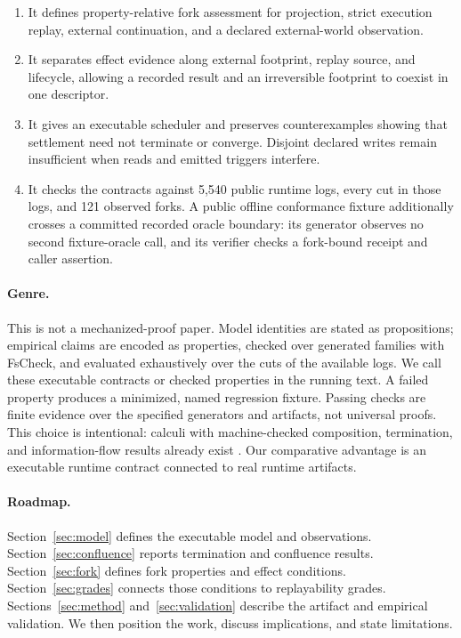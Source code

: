 \begin{enumerate}[leftmargin=*]
  \item It defines property-relative fork assessment for projection, strict
  execution replay, external continuation, and a declared external-world
  observation.

  \item It separates effect evidence along external footprint, replay source,
  and lifecycle, allowing a recorded result and an irreversible footprint to
  coexist in one descriptor.

  \item It gives an executable scheduler and preserves counterexamples showing
  that settlement need not terminate or converge.  Disjoint declared writes
  remain insufficient when reads and emitted triggers interfere.

  \item It checks the contracts against 5,540 public runtime logs, every cut in
  those logs, and 121 observed forks.  A public offline conformance fixture
  additionally crosses a committed recorded oracle boundary: its generator
  observes no second fixture-oracle call, and its verifier checks a fork-bound
  receipt and caller assertion.
\end{enumerate}

\paragraph{Genre.}
This is not a mechanized-proof paper.  Model identities are stated as
propositions; empirical claims are encoded as properties, checked over
generated families with FsCheck, and evaluated exhaustively over the cuts of
the available logs.  We call these executable contracts or checked properties
in the running text.  A failed property produces a minimized, named
regression fixture.  Passing checks are finite evidence over the specified
generators and artifacts, not universal proofs.  This choice is intentional:
calculi with
machine-checked composition, termination, and information-flow results already
exist \cite{liu2026lambdaa,garby2026llmbda}.  Our comparative advantage is an
executable runtime contract connected to real runtime artifacts.

\paragraph{Roadmap.}
Section~\ref{sec:model} defines the executable model and observations.
Section~\ref{sec:confluence} reports termination and confluence results.
Section~\ref{sec:fork} defines fork properties and effect conditions.
Section~\ref{sec:grades} connects those conditions to replayability grades.
Sections~\ref{sec:method} and~\ref{sec:validation} describe the artifact and
empirical validation.  We then position the work, discuss implications, and
state limitations.
